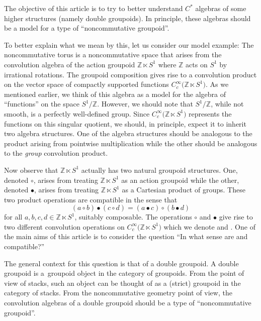 \documentclass[pdftex]{sigma}
\numberwithin{equation}{section}
\theoremstyle{definition}
\newcommand{\BBZ}{\mathbb{Z}}
\newcommand{\stardot}{\overset{{\bullet}}{*}}
\newcommand{\starcirc}{\overset{\circ}{*}}
\begin{document}
The objective of this article is to try to better understand $C^* $ algebras of some higher structures (namely double groupoids). In principle, these algebras should be a model for a type of ``noncommutative groupoid''.

To better explain what we mean by this, let us consider our model example: The noncommutative torus is a noncommutative space that arises from the convolution algebra of the action groupoid $ \BBZ \ltimes S^1 $ where $ \BBZ $ acts on $ S^1 $ by irrational rotations. The groupoid composition gives rise to a convolution product on the vector space of compactly supported functions $ C_c^\infty\big(\BBZ \ltimes S^1\big) $. As we mentioned earlier, we think of this algebra as a model for the algebra of ``functions'' on the space $ S^1/\BBZ $.
However, we should note that $ S^1/\BBZ$, while not smooth, is a perfectly well-defined group.
Since $ C_c^\infty\big(\BBZ \ltimes S^1\big) $ represents the functions on this singular quotient, we should, in principle, expect it to inherit two algebra structures. One of the algebra structures should be analogous to the product arising from pointwise multiplication while the other should be analogous to the \emph{group} convolution product.

Now observe that $ \BBZ \ltimes S^1 $ actually has two natural groupoid structures. One, denoted $ \circ$, arises from treating $ \BBZ \ltimes S^1 $ as an action groupoid while the other, denoted $ \bullet $, arises from treating $ \BBZ \ltimes S^1 $ as a Cartesian product of groups. These two product operations are compatible in the sense that
\begin{equation}\label{eqn:intro.compat}
(a \circ b) \bullet ( c \circ d) = (a \bullet c) \circ (b \bullet d )
\end{equation}
for all $ a,b,c,d \in \BBZ \ltimes S^1 $, suitably composable. The operations $ \circ $ and $ \bullet $ give rise to two different convolution operations on $ C_c^\infty\big(\BBZ \ltimes S^1\big) $ which we denote \smash{$ \starcirc $} and \smash{$ \stardot $}. One of the main aims of this article is to consider the question ``In what sense are \smash{$ \stardot $} and \smash{$ \starcirc$} compatible?''

The general context for this question is that of a double groupoid. A double groupoid is a~groupoid object in the category of groupoids. From the point of view of stacks, such an object can be thought of as a (strict) groupoid in the category of stacks. From the noncommutative geometry point of view, the convolution algebras of a double groupoid should be a type of ``noncommutative groupoid''.
\end{document}
